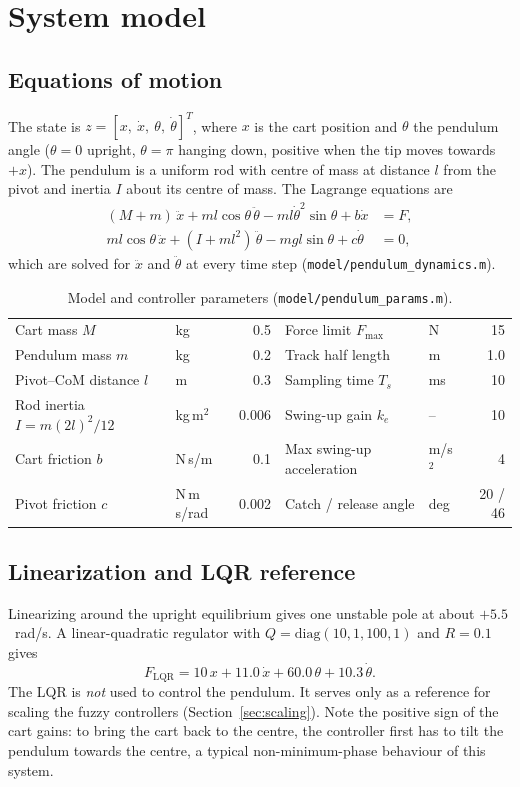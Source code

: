 \documentclass[11pt,a4paper]{article}
\begin{document}
\section{System model}
\subsection{Equations of motion}
The state is $z = [x,\ \dot x,\ \theta,\ \dot\theta]^T$, where $x$ is the cart position and $\theta$ the pendulum angle ($\theta = 0$ upright, $\theta = \pi$ hanging down, positive when the tip moves towards $+x$). The pendulum is a uniform rod with centre of mass at distance $l$ from the pivot and inertia $I$ about its centre of mass. The Lagrange equations are
\begin{align}
(M + m)\,\ddot x + m l \cos\theta\,\ddot\theta - m l \dot\theta^2\sin\theta + b\dot x &= F,\\
m l\cos\theta\,\ddot x + (I + m l^2)\,\ddot\theta - m g l\sin\theta + c\dot\theta &= 0,
\end{align}
which are solved for $\ddot x$ and $\ddot\theta$ at every time step (\texttt{model/pendulum\_dynamics.m}).

\begin{table}[H]
\centering
\caption{Model and controller parameters (\texttt{model/pendulum\_params.m}).}
\begin{tabular}{llr|llr}
\toprule
Cart mass $M$ & kg & 0.5 & Force limit $F_{\max}$ & N & 15\\
Pendulum mass $m$ & kg & 0.2 & Track half length & m & 1.0\\
Pivot--CoM distance $l$ & m & 0.3 & Sampling time $T_s$ & ms & 10\\
Rod inertia $I = m(2l)^2/12$ & kg\,m$^2$ & 0.006 & Swing-up gain $k_e$ & -- & 10\\
Cart friction $b$ & N\,s/m & 0.1 & Max swing-up acceleration & m/s$^2$ & 4\\
Pivot friction $c$ & N\,m\,s/rad & 0.002 & Catch / release angle & deg & 20 / 46\\
\bottomrule
\end{tabular}
\end{table}

\subsection{Linearization and LQR reference}
Linearizing around the upright equilibrium gives one unstable pole at about $+5.5$~rad/s. A linear-quadratic regulator with $Q = \mathrm{diag}(10, 1, 100, 1)$ and $R = 0.1$ gives
\begin{equation}
F_\mathrm{LQR} = 10\,x + 11.0\,\dot x + 60.0\,\theta + 10.3\,\dot\theta .
\end{equation}
The LQR is \emph{not} used to control the pendulum. It serves only as a reference for scaling the fuzzy controllers (Section~\ref{sec:scaling}). Note the positive sign of the cart gains: to bring the cart back to the centre, the controller first has to tilt the pendulum towards the centre, a typical non-minimum-phase behaviour of this system.
\end{document}
